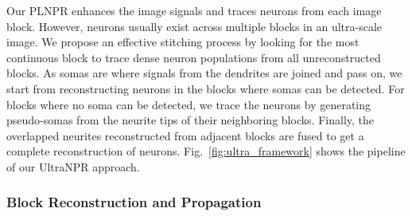 Our PLNPR enhances the image signals and traces neurons from each image block.
However, neurons usually exist across multiple blocks in an ultra-scale image. 
% 
We propose an effective stitching process by looking for the most continuous block to trace dense neuron populations from all unreconstructed blocks. 
%
As somas are where signals from the dendrites are joined and pass on, we start from reconstructing neurons in the blocks where somas can be detected.
For blocks where no soma can be detected, we trace the neurons by generating pseudo-somas from the neurite tips of their neighboring blocks. 
%
Finally, the overlapped neurites reconstructed from adjacent blocks are fused to get a complete reconstruction of neurons. 
Fig.~\ref{fig:ultra_framework} shows the pipeline of our UltraNPR approach. 


\subsubsection{Block Reconstruction and Propagation}
\label{sec:trace}


